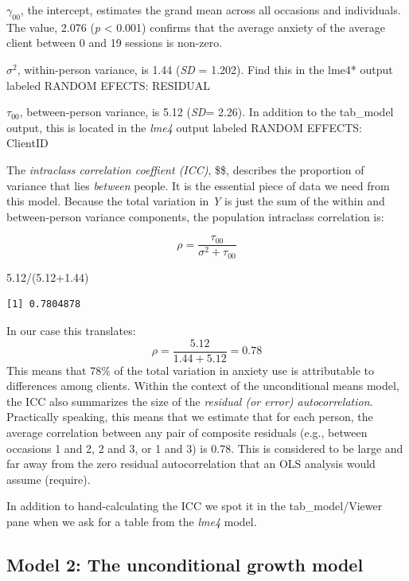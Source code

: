 \documentclass[
  english,
]{book}
\newenvironment{Shaded}{\begin{snugshade}}{\end{snugshade}}
\newcommand{\FloatTok}[1]{\textcolor[rgb]{0.00,0.00,0.81}{#1}}
\newcommand{\NormalTok}[1]{#1}
\newcommand{\SpecialCharTok}[1]{\textcolor[rgb]{0.00,0.00,0.00}{#1}}
\begin{document}
\(\gamma_{00}\), the intercept, estimates the grand mean across all occasions and individuals. The value, 2.076 (\emph{p} \textless{} 0.001) confirms that the average anxiety of the average client between 0 and 19 sessions is non-zero.

\(\sigma^{2}\), within-person variance, is 1.44 (\emph{SD} = 1.202). Find this in the lme4* output labeled RANDOM EFECTS: RESIDUAL

\(\tau_{00}\), between-person variance, is 5.12 (\emph{SD}= 2.26). In addition to the tab\_model output, this is located in the \emph{lme4} output labeled RANDOM EFFECTS: ClientID

The \emph{intraclass correlation coeffient (ICC)}, \$\rho \$, describes the proportion of variance that lies \emph{between} people. It is the essential piece of data we need from this model. Because the total variation in \emph{Y} is just the sum of the within and between-person variance components, the population intraclass correlation is:

\[\rho =\frac{\tau_{00}}{\sigma^{2}+\tau_{00}}\]

\begin{Shaded}
\begin{Highlighting}[]
\FloatTok{5.12}\SpecialCharTok{/}\NormalTok{(}\FloatTok{5.12+1.44}\NormalTok{)}
\end{Highlighting}
\end{Shaded}

\begin{verbatim}
[1] 0.7804878
\end{verbatim}

In our case this translates:\\
\[\rho =\frac{5.12}{1.44 + 5.12} = 0.78\]
This means that 78\% of the total variation in anxiety use is attributable to differences among clients. Within the context of the unconditional means model, the ICC also summarizes the size of the \emph{residual (or error) autocorrelation}. Practically speaking, this means that we estimate that for each person, the average correlation between any pair of composite residuals (e.g., between occasions 1 and 2, 2 and 3, or 1 and 3) is 0.78. This is considered to be large and far away from the zero residual autocorrelation that an OLS analysis would assume (require).

In addition to hand-calculating the ICC we spot it in the tab\_model/Viewer pane when we ask for a table from the \emph{lme4} model.

\hypertarget{model-2-the-unconditional-growth-model}{%
\subsection{Model 2: The unconditional growth model}\label{model-2-the-unconditional-growth-model}}
\end{document}
